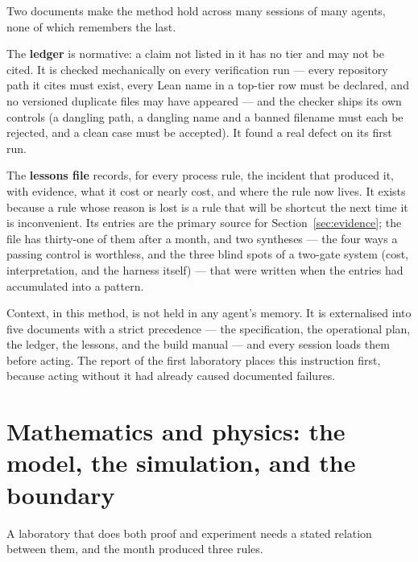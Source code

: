 \documentclass[11pt]{article}
\begin{document}
Two documents make the method hold across many sessions of many agents, none of which
remembers the last.

The \textbf{ledger} is normative: a claim not listed in it has no tier and may not be cited. It
is checked mechanically on every verification run --- every repository path it cites must
exist, every Lean name in a top-tier row must be declared, and no versioned duplicate files may
have appeared --- and the checker ships its own controls (a dangling path, a dangling name and a banned filename must
each be rejected, and a clean case must be accepted). It found a real defect on its first
run.

The \textbf{lessons file} records, for every process rule, the incident that produced it, with
evidence, what it cost or nearly cost, and where the rule now lives. It exists because a rule
whose reason is lost is a rule that will be shortcut the next time it is inconvenient. Its
entries are the primary source for Section~\ref{sec:evidence}; the file has thirty-one of them
after a month, and two syntheses --- the four ways a passing control is worthless, and the three
blind spots of a two-gate system (cost, interpretation, and the harness itself) --- that were
written when the entries had accumulated into a pattern.

Context, in this method, is not held in any agent's memory. It is externalised into five
documents with a strict precedence --- the specification, the operational plan, the ledger, the
lessons, and the build manual --- and every session loads them before acting. The report of the
first laboratory places this instruction first, because acting without it had already caused
documented failures.

\section{Mathematics and physics: the model, the simulation, and the boundary}
\label{sec:physics}

A laboratory that does both proof and experiment needs a stated relation between them, and the
month produced three rules.
\end{document}
